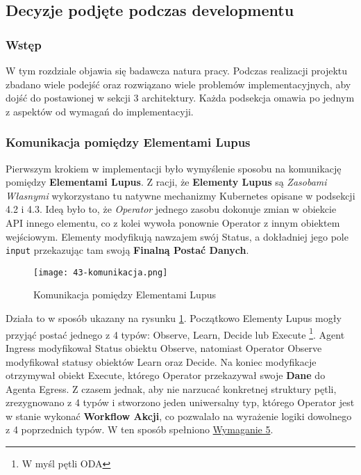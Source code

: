 \subsection{Decyzje podjęte podczas developmentu}

\subsubsection{Wstęp}

W tym rozdziale objawia się badawcza natura pracy. Podczas realizacji projektu zbadano wiele podejść oraz rozwiązano wiele problemów implementacyjnych, aby dojść do postawionej w sekcji 3 architektury. Każda podsekcja omawia po jednym z aspektów od wymagań do implementacyji.

\subsubsection{Komunikacja pomiędzy Elementami Lupus}

Pierwszym krokiem w implementacji było wymyślenie sposobu na komunikację pomiędzy \textbf{Elementami Lupus}. Z racji, że \textbf{Elementy Lupus} są \textit{Zasobami Własnymi} wykorzystano tu natywne mechanizmy Kubernetes opisane w podsekcji 4.2 i 4.3. Ideą było to, że \textit{Operator} jednego zasobu dokonuje zmian w obiekcie API innego elementu, co z kolei wywoła ponownie Operator z innym obiektem wejściowym. Elementy modyfikują nawzajem swój Status, a dokładniej jego pole \texttt{input} przekazując tam swoją \textbf{Finalną Postać Danych}. 


\begin{figure}[!h]
    \centering \texttt{[image: 43-komunikacja.png]}
    \caption{Komunikacja pomiędzy Elementami Lupus}\label{fig:43-komunikacja}
\end{figure}

Działa to w sposób ukazany na rysunku \ref{fig:43-komunikacja}. Początkowo Elementy Lupus mogły przyjąć postać jednego z 4 typów: Observe, Learn, Decide lub Execute \footnote{W myśl pętli ODA}. Agent Ingress modyfikował Status obiektu Observe, natomiast Operator Observe modyfikował statusy obiektów Learn oraz Decide. Na koniec modyfikacje otrzymywał obiekt Execute, którego Operator przekazywał swoje \textbf{Dane} do Agenta Egress. Z czasem jednak, aby nie narzucać konkretnej struktury pętli, zrezygnowano z 4 typów i stworzono jeden uniwersalny typ, którego Operator jest w stanie wykonać \textbf{Workflow Akcji}, co pozwalało na wyrażenie logiki dowolnego z 4 poprzednich typów. W ten sposób spełniono \hyperref[req:5]{Wymaganie 5}. 

